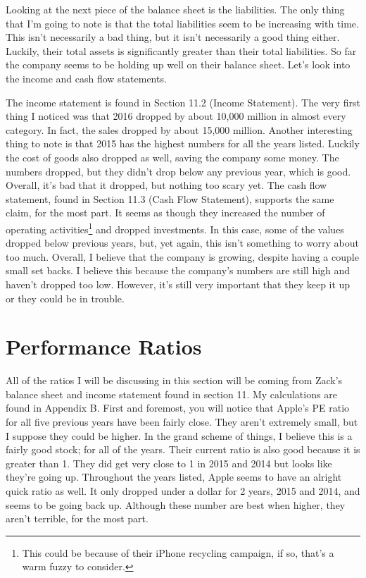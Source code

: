 \documentclass[12pt,a4paper,titlepage]{article}
\begin{document}
Looking at the next piece of the balance sheet is the liabilities. The only
thing that I'm going to note is that the total liabilities seem to be increasing
with time. This isn't necessarily a bad thing, but it isn't necessarily a good
thing either. Luckily, their total assets is significantly greater than their
total liabilities. So far the company seems to be holding up well on their
balance sheet. Let's look into the income and cash flow statements.

The income statement is found in Section 11.2 (Income Statement). The very first
thing I noticed was that 2016 dropped by about 10,000 million in almost every
category. In fact, the sales dropped by about 15,000 million. Another
interesting thing to note is that 2015 has the highest numbers for all the years
listed. Luckily the cost of goods also dropped as well, saving the company some
money. The numbers dropped, but they didn't drop below any previous year, which
is good. Overall, it's bad that it dropped, but nothing too scary yet. The cash
flow statement, found in Section 11.3 (Cash Flow Statement), supports the same
claim, for the most part. It seems as though they increased the number of
operating activities\footnote{This could be because of their iPhone recycling
  campaign, if so, that's a warm fuzzy to consider.} and dropped
investments. In this case, some of the values dropped below previous years,
but, yet again, this isn't something to worry about too much. Overall, I believe
that the company is growing, despite having a couple small set backs. I believe
this because the company's numbers are still high and haven't dropped too
low. However, it's still very important that they keep it up or they could be in
trouble.

\newpage

\section{Performance Ratios}
All of the ratios I will be discussing in this section will be coming from
Zack's balance sheet and income statement found in section 11. My calculations
are found in Appendix B. First and foremost, you will notice that Apple's PE
ratio for all five previous years have been fairly close. They aren't extremely
small, but I suppose they could be higher. In the grand scheme of things, I
believe this is a fairly good stock; for all of the years. Their current ratio
is also good because it is greater than 1. They did get very close to 1 in 2015
and 2014 but looks like they're going up. Throughout the years listed, Apple
seems to have an alright quick ratio as well. It only dropped under a dollar for
2 years, 2015 and 2014, and seems to be going back up. Although these number are
best when higher, they aren't terrible, for the most part.
\end{document}
